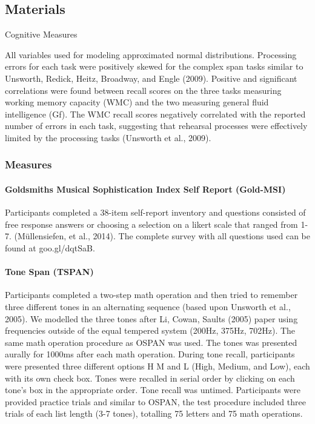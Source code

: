 \documentclass[]{book}
\let\oldparagraph\paragraph
\renewcommand{\paragraph}[1]{\oldparagraph{#1}\mbox{}}
\theoremstyle{definition}
\theoremstyle{definition}
\theoremstyle{definition}
\theoremstyle{remark}
\begin{document}
\hypertarget{materials}{%
\subsection{Materials}\label{materials}}

Cognitive Measures

All variables used for modeling approximated normal distributions.
Processing errors for each task were positively skewed for the complex
span tasks similar to Unsworth, Redick, Heitz, Broadway, and Engle
(2009). Positive and significant correlations were found between recall
scores on the three tasks measuring working memory capacity (WMC) and
the two measuring general fluid intelligence (Gf). The WMC recall scores
negatively correlated with the reported number of errors in each task,
suggesting that rehearsal processes were effectively limited by the
processing tasks (Unsworth et al., 2009).

\hypertarget{measures}{%
\subsubsection{Measures}\label{measures}}

\hypertarget{goldsmiths-musical-sophistication-index-self-report-gold-msi}{%
\paragraph{Goldsmiths Musical Sophistication Index Self Report
(Gold-MSI)}\label{goldsmiths-musical-sophistication-index-self-report-gold-msi}}

Participants completed a 38-item self-report inventory and questions
consisted of free response answers or choosing a selection on a likert
scale that ranged from 1-7. (Müllensiefen, et al., 2014). The complete
survey with all questions used can be found at goo.gl/dqtSaB.

\hypertarget{tone-span-tspan}{%
\paragraph{Tone Span (TSPAN)}\label{tone-span-tspan}}

Participants completed a two-step math operation and then tried to
remember three different tones in an alternating sequence (based upon
Unsworth et al., 2005). We modelled the three tones after Li, Cowan,
Saults (2005) paper using frequencies outside of the equal tempered
system (200Hz, 375Hz, 702Hz). The same math operation procedure as OSPAN
was used. The tones was presented aurally for 1000ms after each math
operation. During tone recall, participants were presented three
different options H M and L (High, Medium, and Low), each with its own
check box. Tones were recalled in serial order by clicking on each
tone's box in the appropriate order. Tone recall was untimed.
Participants were provided practice trials and similar to OSPAN, the
test procedure included three trials of each list length (3-7 tones),
totalling 75 letters and 75 math operations.
\end{document}
